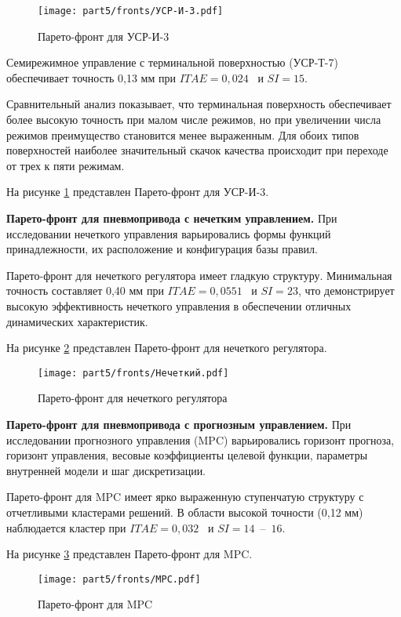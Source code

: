 \begin{figure}[h]
	\centering
	\texttt{[image: part5/fronts/УСР-И-3.pdf]}
	\caption{Парето-фронт для УСР-И-3}
	\label{fig:scrolling_pareto}
\end{figure}

Семирежимное управление с терминальной поверхностью (УСР-Т-7) обеспечивает
точность 0,13 мм при $ITAE = 0,024$ \si{\metre\per\second\square} и $SI = 15$.

Сравнительный анализ показывает, что терминальная поверхность обеспечивает более высокую точность
при малом числе режимов, но при увеличении числа режимов преимущество
становится менее выраженным. Для обоих типов поверхностей наиболее значительный скачок качества происходит при переходе от трех к пяти режимам.

На рисунке \ref{fig:scrolling_pareto} представлен Парето-фронт для УСР-И-3.

\textbf{Парето-фронт для пневмопривода с нечетким управлением.}
При исследовании нечеткого управления варьировались формы
функций принадлежности, их расположение и конфигурация базы правил.

Парето-фронт для нечеткого регулятора имеет гладкую структуру.
Минимальная точность составляет 0,40 мм при $ITAE = 0,0551$ \si{\metre\per\second\square} и $SI = 23$,
что демонстрирует высокую эффективность нечеткого управления в обеспечении отличных динамических характеристик.

На рисунке \ref{fig:fuzzy_pareto} представлен Парето-фронт для нечеткого регулятора.
\begin{figure}[h]
	\centering
	\texttt{[image: part5/fronts/Нечеткий.pdf]}
	\caption{Парето-фронт для нечеткого регулятора}
	\label{fig:fuzzy_pareto}
\end{figure}

\textbf{Парето-фронт для пневмопривода с прогнозным управлением.}
При исследовании прогнозного управления (MPC) варьировались горизонт прогноза,
горизонт управления, весовые коэффициенты целевой функции, параметры внутренней модели и шаг дискретизации.

Парето-фронт для MPC имеет ярко выраженную ступенчатую структуру с отчетливыми
кластерами решений. В области высокой точности (0,12 мм) наблюдается кластер
при $ITAE = 0,032$ \si{\metre\per\second\square} и $SI = 14$~--~$16$.

На рисунке \ref{fig:mpc_pareto} представлен Парето-фронт для MPC.
\begin{figure}[h]
	\centering
	\texttt{[image: part5/fronts/MPC.pdf]}
	\caption{Парето-фронт для MPC}
	\label{fig:mpc_pareto}
\end{figure}

